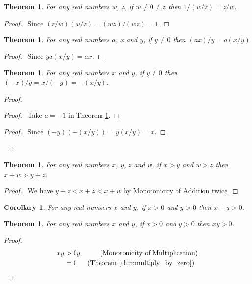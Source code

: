 \documentclass{book}
\let\qed\relax
\newtheorem{cor}{Corollary}[ax]
\newtheorem{thm}[ax]{Theorem}
\theoremstyle{definition}
\begin{document}
\begin{thm}
For any real numbers $w$, $z$, if $w \neq 0 \neq z$ then $1 / (w / z) = z/w$.
\end{thm}

\begin{proof}
\pf\ Since $(z/w)(w/z) = (wz)/(wz) = 1$. \qed
\end{proof}

\begin{thm}
\label{thm:multiply_quotient}
For any real numbers $a$, $x$ and $y$, if $y \neq 0$ then $(ax)/y = a(x/y)$
\end{thm}

\begin{proof}
\pf\ Since $ya(x/y) = ax$. \qed
\end{proof}

\begin{thm}
For any real numbers $x$ and $y$, if $y \neq 0$ then $(-x)/y = x/(-y) = -(x/y)$.
\end{thm}

\begin{proof}
\pf
{}
\begin{proof}
	\pf\ Take $a = -1$ in Theorem \ref{thm:multiply_quotient}.
\end{proof}
\begin{proof}
	\pf\ Since $(-y)(-(x/y)) = y(x/y) = x$.
\end{proof}
\qed
\end{proof}

\begin{thm}
For any real numbers $x$, $y$, $z$ and $w$, if $x > y$ and $w > z$ then $x + w > y + z$.
\end{thm}

\begin{proof}
\pf\ We have $y + z < x + z < x + w$ by Monotonicity of Addition twice. \qed
\end{proof}

\begin{cor}
For any real numbers $x$ and $y$, if $x > 0$ and $y > 0$ then $x + y > 0$.
\end{cor}

\begin{thm}
For any real numbers $x$ and $y$, if $x > 0$ and $y > 0$ then $xy > 0$.
\end{thm}

\begin{proof}
\pf
\begin{align*}
	xy & > 0y & (\text{Monotonicity of Multiplication}) \\
	& = 0 & (\text{Theorem \ref{thm:multiply_by_zero}}) \enspace \qed
\end{align*}
\end{proof}
\end{document}
